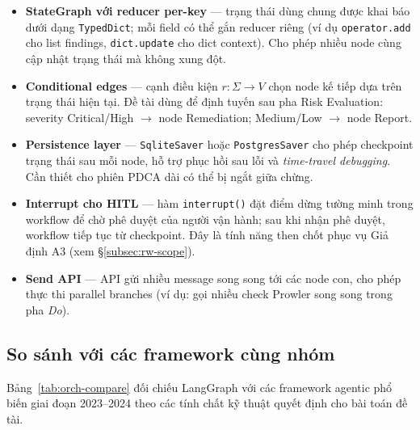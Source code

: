 \begin{itemize}
  \item \textbf{StateGraph với reducer per-key} --- trạng thái dùng chung được khai báo dưới dạng \texttt{TypedDict}; mỗi field có thể gắn reducer riêng (ví dụ \texttt{operator.add} cho list findings, \texttt{dict.update} cho dict context). Cho phép nhiều node cùng cập nhật trạng thái mà không xung đột.
  \item \textbf{Conditional edges} --- cạnh điều kiện $r: \Sigma \to V$ chọn node kế tiếp dựa trên trạng thái hiện tại. Đề tài dùng để định tuyến sau pha Risk Evaluation: severity Critical/High $\rightarrow$ node Remediation; Medium/Low $\rightarrow$ node Report.
  \item \textbf{Persistence layer} --- \texttt{SqliteSaver} hoặc \texttt{PostgresSaver} cho phép checkpoint trạng thái sau mỗi node, hỗ trợ phục hồi sau lỗi và \textit{time-travel debugging}. Cần thiết cho phiên PDCA dài có thể bị ngắt giữa chừng.
  \item \textbf{Interrupt cho HITL} --- hàm \texttt{interrupt()} đặt điểm dừng tường minh trong workflow để chờ phê duyệt của người vận hành; sau khi nhận phê duyệt, workflow tiếp tục từ checkpoint. Đây là tính năng then chốt phục vụ Giả định A3 (xem §\ref{subsec:rw-scope}).
  \item \textbf{Send API} --- API gửi nhiều message song song tới các node con, cho phép thực thi parallel branches (ví dụ: gọi nhiều check Prowler song song trong pha \textit{Do}).
\end{itemize}

\subsection{So sánh với các framework cùng nhóm}
\label{subsec:orch-compare}

Bảng~\ref{tab:orch-compare} đối chiếu LangGraph với các framework agentic phổ biến giai đoạn 2023--2024 theo các tính chất kỹ thuật quyết định cho bài toán đề tài.

